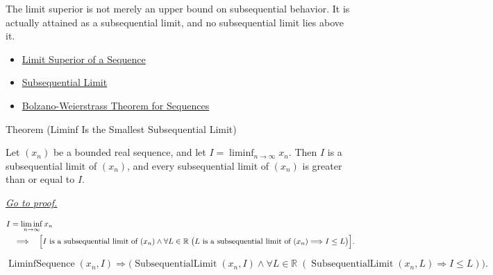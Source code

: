 \begin{remark*}[Interpretation]
The limit superior is not merely an upper bound on subsequential behavior. It
is actually attained as a subsequential limit, and no subsequential limit lies
above it.
\end{remark*}

\begin{remark*}[Dependencies]\hfill
\begin{itemize}
  \item \hyperref[def:limsup-sequence]{Limit Superior of a Sequence}
  \item \hyperref[def:subsequential-limit]{Subsequential Limit}
  \item \hyperref[thm:bolzano-weierstrass-sequences]{Bolzano-Weierstrass Theorem for Sequences}
\end{itemize}
\end{remark*}


\begin{theorembox}{Theorem (Liminf Is the Smallest Subsequential Limit)}
\begin{theorem}
\label{thm:liminf-smallest-subsequential-limit}
Let $(x_n)$ be a bounded real sequence, and let
$I=\liminf_{n\to\infty}x_n$. Then $I$ is a subsequential limit of
$(x_n)$, and every subsequential limit of $(x_n)$ is greater than or
equal to $I$.

\smallskip
\noindent
\hyperref[prf:liminf-smallest-subsequential-limit]{\textit{Go to proof.}}
\end{theorem}
\end{theorembox}

\begin{remark*}
\[
\begin{aligned}
&I=\liminf_{n\to\infty}x_n\\
&\quad\Longrightarrow\quad
\Bigl[
  I\text{ is a subsequential limit of }(x_n)
  \land
  \forall L\in\mathbb{R}\;
  \bigl(L\text{ is a subsequential limit of }(x_n)\Longrightarrow I\le L\bigr)
\Bigr].
\end{aligned}
\]
\end{remark*}

\begin{remark*}
\[
\operatorname{LiminfSequence}(x_n,I)
\Longrightarrow
\bigl(
  \operatorname{SubsequentialLimit}(x_n,I)
  \land
  \forall L\in\mathbb{R}\;
  (\operatorname{SubsequentialLimit}(x_n,L)\Longrightarrow I\le L)
\bigr).
\]
\end{remark*}

